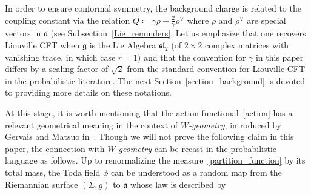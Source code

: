 \documentclass[10pt]{amsart}
\theoremstyle{definition}\newtheorem{defi}[theo]{Definition}\newtheorem{rema}[theo]{Remark}\newtheorem{exam}[theo]{Example}\newtheorem{exem}[theo]{Example}\newtheorem{nota}[theo]{Notation}
\newcommand{\frksl}{\mathfrak{sl}}
\newcommand{\frkg}{\mathfrak{g}}
\newcommand{\frka}{\mathfrak{a}}
\begin{document}
In order to ensure conformal symmetry, the background charge is related to the coupling constant via the relation $Q\coloneqq \gamma\rho+\frac2\gamma\rho^\vee$ where $\rho$ and $\rho^\vee$ are special vectors in $\frka$ (see Subsection~\ref{Lie_reminders}. Let us emphasize that one recovers Liouville CFT when $\frkg$ is the Lie Algebra $\frksl_2$ (of $2\times 2$ complex matrices with vanishing trace, in which case $r=1$) and that the convention for $\gamma$ in this paper differs by a scaling factor of $\sqrt{2}$ from the standard convention for Liouville CFT in the probabilistic literature. The next Section~\ref{section_background} is devoted to providing more details on these notations.


At this stage, it is worth mentioning that the action functional~\eqref{action} has a relevant geometrical meaning in the context of \emph{$W$-geometry}, introduced by Gervais and Matsuo in~\cite{GeMa92}. Though we will not prove the following claim in this paper, the connection with \emph{$W$-geometry} can be recast in the probabilistic language as follows. Up to renormalizing the measure~\eqref{partition_function} by its total mass, the Toda field $\phi$ can be understood as a random map from the Riemannian surface $(\Sigma,g)$ to $\frka$ whose law is described by
\end{document}
